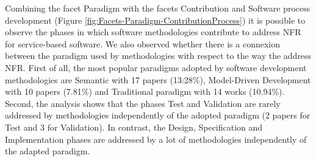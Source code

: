 Combining the facet Paradigm with the facets Contribution and Software process development (Figure
\ref{fig:Facets-Paradigm-ContributionProcess})  it is possible to observe the phases in which software methodologies contribute to address NFR for service-based software. We also  observed whether there is a connexion between the paradigm used by methodologies with respect to the way the address NFR.
First of all, the most popular paradigms adopted by software development methodologies are Semantic with 17 papers (13:28\%), Model-Driven Development with
10 papers (7.81\%) and Traditional paradigm with 14 works (10.94\%). 
Second, the analysis shows that the phases Test and Validation are rarely addressed by methodologies independently of the adopted paradigm (2 papers for Test and 3 for Validation). In contrast, the Design, Specification and Implementation phases are addressed by a lot of methodologies independently of the adapted paradigm.
 





